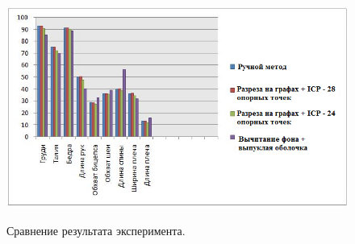 \begin{figure}[ht!]
\centering
\includegraphics [scale=0.8] {images/h24.png}
\begin{center}
\caption{Сравнение результата эксперимента.} \label{img24} \label{img24}
\end{center}
\end{figure}
